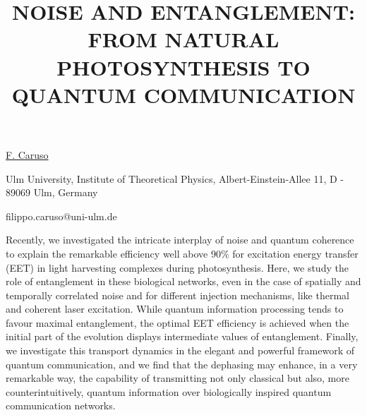 \title{NOISE AND ENTANGLEMENT: FROM NATURAL PHOTOSYNTHESIS TO QUANTUM COMMUNICATION}

\underline{F. Caruso} 

{\normalsize{\vspace{-4mm}
Ulm University, Institute of Theoretical Physics, Albert-Einstein-Allee 11, D - 89069 Ulm, Germany

\email filippo.caruso@uni-ulm.de}}

Recently, we investigated the intricate interplay of noise and quantum coherence to explain the
remarkable efficiency well above 90\% for excitation energy transfer (EET) in light harvesting
complexes during photosynthesis. Here, we study the role of entanglement in these biological
networks, even in the case of spatially and temporally correlated noise and for different injection
mechanisms, like thermal and coherent laser excitation. While quantum information processing tends
to favour maximal entanglement, the optimal EET efficiency is achieved when the initial part of the
evolution displays intermediate values of entanglement. Finally, we investigate this transport
dynamics in the elegant and powerful framework of quantum communication, and we find that the
dephasing may enhance, in a very remarkable way, the capability of transmitting not only classical
but also, more counterintuitively, quantum information over biologically inspired quantum
communication networks.

\vspace{\baselineskip} 